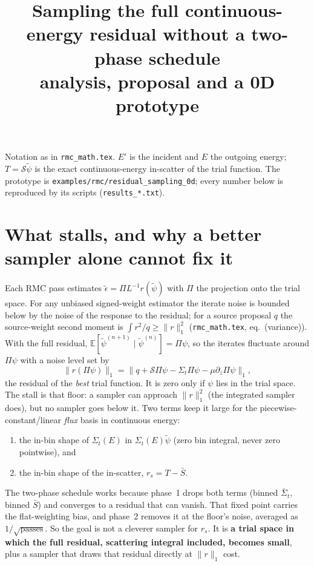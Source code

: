\documentclass[11pt]{article}
\title{Sampling the full continuous-energy residual without a two-phase schedule\\
\large analysis, proposal and a 0D prototype}
\date{}
\newcommand{\tpsi}{\tilde\psi}
\newcommand{\teps}{\tilde\epsilon}
\newcommand{\Sbar}{\bar S}
\newcommand{\Sigt}{\Sigma_t}
\newcommand{\E}{\mathbb{E}}
\begin{document}
\maketitle

\noindent Notation as in \texttt{rmc\_math.tex}. $E'$ is the incident and $E$ the
outgoing energy; $T=\mathcal S\tpsi$ is the exact continuous-energy in-scatter of the
trial function. The prototype is \texttt{examples/rmc/residual\_sampling\_0d}; every
number below is reproduced by its scripts (\texttt{results\_*.txt}).

\section{What stalls, and why a better sampler alone cannot fix it}

Each RMC pass estimates $\teps=\Pi L^{-1}r(\tpsi)$ with $\Pi$ the projection onto the
trial space. For any unbiased signed-weight estimator the iterate noise is bounded below
by the noise of the response to the residual; for a source proposal $q$ the source-weight
second moment is $\int r^2/q\ge\|r\|_1^2$ (\texttt{rmc\_math.tex}, eq.~(variance)).
With the full residual, $\E[\tpsi^{(n+1)}\mid\tpsi^{(n)}]=\Pi\psi$, so the iterates
fluctuate around $\Pi\psi$ with a noise level set by
\begin{equation}
  \|r(\Pi\psi)\|_1 = \|q+\mathcal S\Pi\psi-\Sigt\Pi\psi-\mu\partial_z\Pi\psi\|_1 ,
\end{equation}
the residual of the \emph{best} trial function. It is zero only if $\psi$ lies in the
trial space. The stall is that floor: a sampler can approach $\|r\|_1^2$ (the integrated
sampler does), but no sampler goes below it. Two terms keep it large for the
piecewise-constant/linear \emph{flux} basis in continuous energy:
\begin{enumerate}
  \item the in-bin shape of $\Sigt(E)$ in $\Sigt(E)\tpsi$ (zero bin integral, never
  zero pointwise), and
  \item the in-bin shape of the in-scatter, $r_s=T-\Sbar$.
\end{enumerate}
The two-phase schedule works because phase~1 drops both terms (binned $\bar\Sigma_t$,
binned $\Sbar$) and converges to a residual that can vanish. That fixed point carries
the flat-weighting bias, and phase~2 removes it at the floor's noise, averaged as
$1/\sqrt{\text{passes}}$. So the goal is not a cleverer sampler for $r_s$. It is
\textbf{a trial space in which the full residual, scattering integral included, becomes
small}, plus a sampler that draws that residual directly at $\|r\|_1$ cost.
\end{document}
